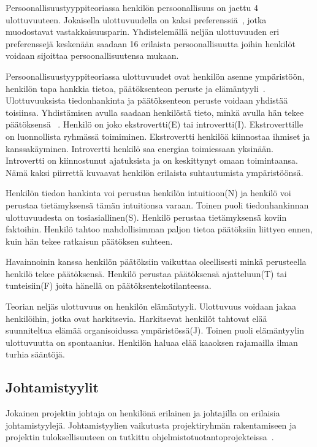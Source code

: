\documentclass[finnish]{tktltiki2}
\theoremstyle{definition}
\theoremstyle{remark}
\begin{document}
Persoonallisuustyyppiteoriassa henkilön persoonallisuus on jaettu 4 ulottuvuuteen. Jokaisella ulottuvuudella on kaksi preferenssiä~\cite{bradley1997effect}, jotka muodostavat vastakkaisuusparin. Yhdistelemällä neljän ulottuvuuden eri preferenssejä keskenään saadaan 16 erilaista persoonallisuutta joihin henkilöt voidaan sijoittaa persoonallisuutensa mukaan.

Persoonallisuustyyppiteoriassa ulottuvuudet ovat henkilön asenne ym\-pä\-ris\-töön, henkilön tapa hankkia tietoa, päätöksenteon peruste ja elämäntyyli~\cite{bradley1997effect}. Ulottuvuuksista tiedonhankinta ja päätöksenteon peruste voidaan yhdistää toisiinsa. Yhdistämisen avulla saadaan henkilöstä tieto, minkä avulla hän tekee päätöksensä ~\cite{bradley1997effect}.
Henkilö on joko ekstrovertti(E) tai introvertti(I). Ekstroverttille on luonnollista ryhmässä toimiminen. Ekstrovertti henkilöä kiinnostaa ihmiset ja kanssakäyminen. Introvertti henkilö saa energiaa toimiessaan yksinään. Introvertti on kiinnostunut ajatuksista ja on keskittynyt omaan toimintaansa. Nämä kaksi piirrettä kuvaavat henkilön erilaista suhtautumista ympäristöönsä.

Henkilön tiedon hankinta voi perustua henkilön intuitioon(N) ja henkilö voi perustaa tietämyksensä tämän intuitionsa varaan. Toinen puoli tiedonhankinnan ulottuvuudesta on tosiasiallinen(S). Henkilö perustaa tietämyksensä koviin faktoihin. Henkilö tahtoo mahdollisimman paljon tietoa päätöksiin liittyen ennen, kuin hän tekee ratkaisun päätöksen suhteen.

Havainnoinin kanssa henkilön päätöksiin vaikuttaa oleellisesti minkä perusteella henkilö tekee päätöksensä. Henkilö perustaa päätöksensä ajatteluun(T) tai tunteisiin(F) joita hänellä on päätöksentekotilanteessa.

Teorian neljäs ulottuvuus on henkilön elämäntyyli. Ulottuvuus voidaan jakaa henkilöihin, jotka ovat harkitsevia. Harkitsevat henkilöt tahtovat elää suunniteltua elämää organisoidussa ympäristössä(J). Toinen puoli elämäntyylin ulottuvuutta on spontaanius. Henkilön haluaa elää kaaoksen rajamailla ilman turhia sääntöjä.
   

\subsection{Johtamistyylit}

Jokainen projektin johtaja on henkilönä erilainen ja johtajilla on erilaisia johtamistyylejä. Johtamistyylien vaikutusta projektiryhmän rakentamiseen ja projektin tuloksellisuuteen on tutkittu ohjelmistotuotantoprojekteissa~\cite{Dhomne:2012:ITL:2382887.2382899}.
\end{document}
